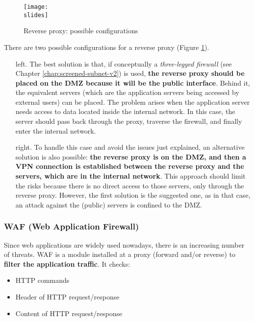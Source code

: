 \begin{figure}[h]
    \centering
    \texttt{[image: \\slides]}
    \caption{Reverse proxy: possible configurations}
    \label{fig:reverse-proxy}
\end{figure}


There are two possible configurations for a reverse proxy (Figure \ref{fig:reverse-proxy}).
\begin{itemize}
    \item [left.] The best solution is that, if conceptually a \textit{three-legged firewall} (see Chapter \ref{chap:screened-subnet-v2}) is used, \textbf{the reverse proxy should be placed on the DMZ because it will be the public interface}. Behind it, the equivalent servers (which are the application servers being accessed by external users) can be placed. The problem arises when the application server needs access to data located inside the internal network. In this case, the server should pass back through the proxy, traverse the firewall, and finally enter the internal network.
    \item [right.] To handle this case and avoid the issues just explained, an alternative solution is also possible: \textbf{the reverse proxy is on the DMZ, and then a VPN connection is established between the reverse proxy and the servers, which are in the internal network}. This approach should limit the risks because there is no direct access to those servers, only through the reverse proxy. However, the first solution is the suggested one, as in that case, an attack against the (public) servers is confined to the DMZ.
\end{itemize}


\subsubsection{WAF (Web Application Firewall)}

Since web applications are widely used nowadays, there is an increasing number of threats. WAF is a module installed at a proxy (forward and/or reverse) to \textbf{filter the application traffic}. It checks:

\begin{itemize}
    \item HTTP commands
    \item Header of HTTP request/response
    \item Content of HTTP request/response
\end{itemize}

